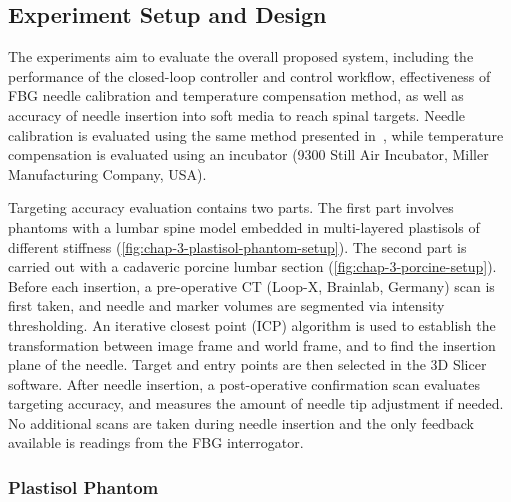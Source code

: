 \subsection{Experiment Setup and Design}
\label{sec:chap-3-experiment-setup-and-design-2}

The experiments aim to evaluate the overall proposed system, including the performance of the closed-loop controller and control workflow, effectiveness of FBG needle calibration and temperature compensation method, as well as accuracy of needle insertion into soft media to reach spinal targets. Needle calibration is evaluated using the same method presented in~\parencite{kimShapeDeterminationNeedle2017}, while temperature compensation is evaluated using an incubator (9300 Still Air Incubator, Miller Manufacturing Company, USA).

Targeting accuracy evaluation contains two parts. The first part involves phantoms with a lumbar spine model embedded in multi-layered plastisols of different stiffness (\cref{fig:chap-3-plastisol-phantom-setup}). The second part is carried out with a cadaveric porcine lumbar section (\cref{fig:chap-3-porcine-setup}). Before each insertion, a pre-operative CT (Loop-X, Brainlab, Germany) scan is first taken, and needle and marker volumes are segmented via intensity thresholding. An iterative closest point (ICP) algorithm is used to establish the transformation between image frame and world frame, and to find the insertion plane of the needle. Target and entry points are then selected in the 3D Slicer software. After needle insertion, a post-operative confirmation scan evaluates targeting accuracy, and measures the amount of needle tip adjustment if needed. No additional scans are taken during needle insertion and the only feedback available is readings from the FBG interrogator.

\subsubsection{Plastisol Phantom}
\label{sec:chap-3-plastisol-phantom}


